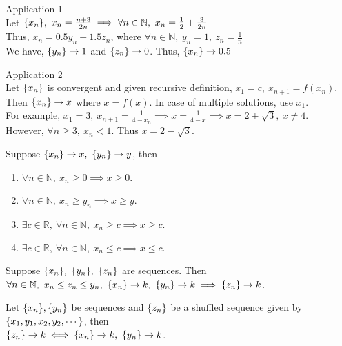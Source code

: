 	\begin{remark}Application 1\\
		Let $\{x_n\},\ x_n = \frac{n+3}{2n} \implies \forall n \in \mathbb{N},\ x_n = \frac{1}{2} + \frac{3}{2n}$\\
		Thus, $x_n = 0.5y_n + 1.5z_n$, where $\forall n \in \mathbb{N},\ y_n = 1,\ z_n = \frac{1}{n}$\\
		We have, $\{y_n\} \to 1$ and $\{z_n\} \to 0$. Thus, $\{x_n\} \to 0.5$
	\end{remark}

	\begin{remark}Application 2\\
		Let $\{x_n\}$ is convergent and given recursive definition, $x_1 = c,\ x_{n+1} = f(x_n)$. Then $\{x_n\} \to x$ where $x = f(x)$. In case of multiple solutions, use $x_1$.\\
		For example, $x_1 = 3,\ x_{n+1} = \frac{1}{4-x_n} \implies x = \frac{1}{4-x} \implies x = 2 \pm \sqrt{3},\ x \ne 4$.\\
		However, $\forall n \ge 3,\ x_n < 1$. Thus $x = 2 - \sqrt{3}$.
	\end{remark}

	\begin{theorem}
		Suppose $\sequence{x_n} \to x,\ \sequence{y_n} \to y$, then
		\begin{enumerate}
			\item $\forall n \in \mathbb{N},\ x_n \ge 0 \implies x \ge 0$.
			\item $\forall n \in \mathbb{N},\ x_n \ge y_n \implies x \ge y$.
			\item $\exists c \in \mathbb{R},\ \forall n \in \mathbb{N},\ x_n \ge c \implies x \ge c$.
			\item $\exists c \in \mathbb{R},\ \forall n \in \mathbb{N},\ x_n \le c \implies x \le c$.
		\end{enumerate}
	\end{theorem}

	\begin{theorem}[Squeeze]
		Suppose $\sequence{x_n},\ \sequence{y_n},\ \sequence{z_n}$ are sequences. Then \\$\forall n \in \mathbb{N},\ x_n \le z_n \le y_n,\ \{x_n\} \to k,\ \{y_n\} \to k \implies \{z_n\} \to k$.
	\end{theorem}

	\begin{remark}
		Let $\{x_n\},\{y_n\}$ be sequences and $\{z_n\}$ be a shuffled sequence given by $\{ x_1,y_1,x_2,y_2,\cdots \}$, then\\ $\{z_n\} \to k \iff \{x_n\} \to k,\ \{y_n\} \to k$.
	\end{remark}


